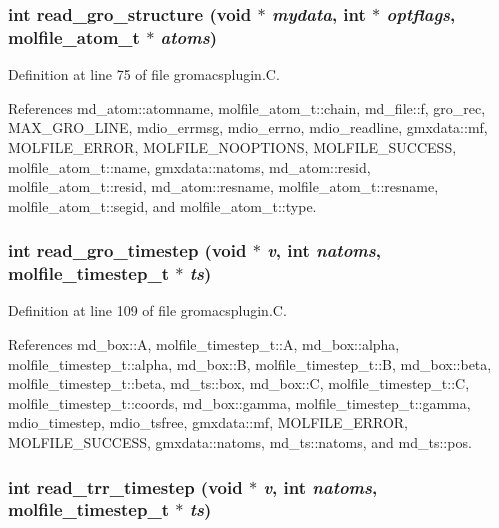 \subsubsection{\setlength{\rightskip}{0pt plus 5cm}int read\_\-gro\_\-structure (void $\ast$ {\em mydata}, int $\ast$ {\em optflags}, {\bf molfile\_\-atom\_\-t} $\ast$ {\em atoms})\hspace{0.3cm}{\tt  [static]}}\label{gromacsplugin_8C_a8}




Definition at line 75 of file gromacsplugin.C.

References md\_\-atom::atomname, molfile\_\-atom\_\-t::chain, md\_\-file::f, gro\_\-rec, MAX\_\-GRO\_\-LINE, mdio\_\-errmsg, mdio\_\-errno, mdio\_\-readline, gmxdata::mf, MOLFILE\_\-ERROR, MOLFILE\_\-NOOPTIONS, MOLFILE\_\-SUCCESS, molfile\_\-atom\_\-t::name, gmxdata::natoms, md\_\-atom::resid, molfile\_\-atom\_\-t::resid, md\_\-atom::resname, molfile\_\-atom\_\-t::resname, molfile\_\-atom\_\-t::segid, and molfile\_\-atom\_\-t::type.
\subsubsection{\setlength{\rightskip}{0pt plus 5cm}int read\_\-gro\_\-timestep (void $\ast$ {\em v}, int {\em natoms}, {\bf molfile\_\-timestep\_\-t} $\ast$ {\em ts})\hspace{0.3cm}{\tt  [static]}}\label{gromacsplugin_8C_a9}




Definition at line 109 of file gromacsplugin.C.

References md\_\-box::A, molfile\_\-timestep\_\-t::A, md\_\-box::alpha, molfile\_\-timestep\_\-t::alpha, md\_\-box::B, molfile\_\-timestep\_\-t::B, md\_\-box::beta, molfile\_\-timestep\_\-t::beta, md\_\-ts::box, md\_\-box::C, molfile\_\-timestep\_\-t::C, molfile\_\-timestep\_\-t::coords, md\_\-box::gamma, molfile\_\-timestep\_\-t::gamma, mdio\_\-timestep, mdio\_\-tsfree, gmxdata::mf, MOLFILE\_\-ERROR, MOLFILE\_\-SUCCESS, gmxdata::natoms, md\_\-ts::natoms, and md\_\-ts::pos.
\subsubsection{\setlength{\rightskip}{0pt plus 5cm}int read\_\-trr\_\-timestep (void $\ast$ {\em v}, int {\em natoms}, {\bf molfile\_\-timestep\_\-t} $\ast$ {\em ts})\hspace{0.3cm}{\tt  [static]}}\label{gromacsplugin_8C_a16}




